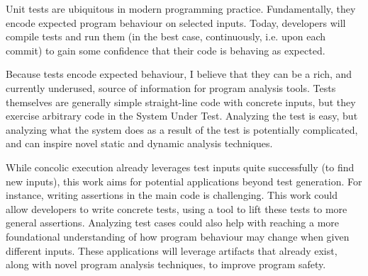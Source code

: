 Unit tests are ubiquitous in modern programming practice. Fundamentally, they encode expected program behaviour on selected inputs. Today, developers will compile tests and run them (in the best case, continuously, i.e. upon each commit) to gain some confidence that their code is behaving as expected.

Because tests encode expected behaviour, I believe that they can be a rich, and currently underused, source of information for program analysis tools. Tests themselves are generally simple straight-line code with concrete inputs, but they exercise arbitrary code in the System Under Test. Analyzing the test is easy, but analyzing what the system does as a result of the test is potentially complicated, and can inspire novel static and dynamic analysis techniques. 

While concolic execution already leverages test inputs quite successfully (to find new inputs), this work aims for potential applications beyond test generation. For instance, writing assertions in the main code is challenging. This work could allow developers to write concrete tests, using a tool to lift these tests to more general assertions. Analyzing test cases could also help with reaching a more foundational understanding of how program behaviour may change when given different inputs. These applications will leverage artifacts that already exist, along with novel program analysis techniques, to improve program safety.
